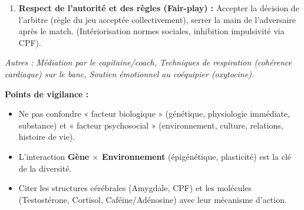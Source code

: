 \documentclass[11pt]{article}
\begin{document}
\begin{corrige}
\begin{enumerate}
\begin{enumerate}
\item \textbf{Respect de l'autorité et des règles (Fair-play) :} Accepter la décision de l'arbitre (règle du jeu acceptée collectivement), serrer la main de l'adversaire après le match. (Intériorisation normes sociales, inhibition impulsivité via CPF).
\end{enumerate}
\textit{Autres : Médiation par le capitaine/coach, Techniques de respiration (cohérence cardiaque) sur le banc, Soutien émotionnel au coéquipier (oxytocine).}
\end{enumerate}
\textbf{Points de vigilance :}
\begin{itemize}
\item Ne pas confondre « facteur biologique » (génétique, physiologie immédiate, substance) et « facteur psychosocial » (environnement, culture, relations, histoire de vie).
\item L'interaction \textbf{Gène $\times$ Environnement} (épigénétique, plasticité) est la clé de la diversité.
\item Citer les structures cérébrales (Amygdale, CPF) et les molécules (Testostérone, Cortisol, Caféine/Adénosine) avec leur mécanisme d'action.
\end{itemize}
\end{corrige}
\end{document}
